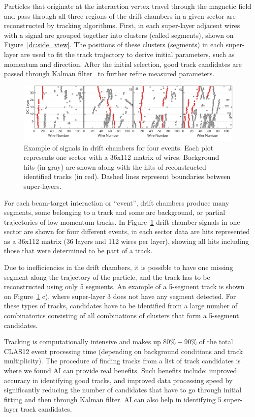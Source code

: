 Particles that originate at the interaction vertex travel through the magnetic field and pass through all 
three regions of the drift chambers in a given sector are reconstructed by tracking algorithms. First, 
in each super-layer adjacent wires with a signal are grouped together into clusters (called segments), 
shown on Figure~\ref{dc:side_view}. The positions of these clusters (segments) in each super-layer 
are used to fit the track trajectory to derive initial parameters, such as momentum and direction. 
After the initial selection, good track candidates are passed through Kalman filter~\cite{Kalman1960} 
 to further refine measured parameters.

\begin{figure}[!ht]
\begin{center}
 \includegraphics[width=6.2in]{images/figure_dc_examples.pdf}
\caption {Example of signals in drift chambers for four events. Each plot represents one sector with a 
36x112 matrix of wires. Background hits (in gray) are shown along with the hits of reconstructed 
identified tracks (in red). Dashed lines represent boundaries between super-layers.}
 \label{dc:events_sector}
 \end{center}
\end{figure}

For each beam-target interaction or ``event'', drift chambers produce many segments, some belonging 
to a track and some are background, or partial trajectories of low momentum tracks. In Figure~\ref{dc:events_sector} 
drift chamber signals in one sector are shown for four different  events, in each sector data are hits 
represented as a 36x112 matrix (36 layers and 112 wires per layer), showing all hits including those that 
were determined to be part of a track. 

Due to inefficiencies in the drift chambers, it is possible to have one missing segment along the trajectory 
of the particle, and the track has to be reconstructed using only 5 segments. An example of a 5-segment 
track is shown on Figure~\ref{dc:events_sector} c), where super-layer 3 does not have any segment detected. 
For these types of tracks, candidates have to be identified from a large number of combinatorics consisting 
of all combinations of clusters that form a  5-segment candidates. 

Tracking is computationally intensive and makes up $80\%-90\%$ of the total CLAS12 event processing 
time (depending on background conditions and track multiplicity). The procedure of finding tracks from a 
list of track candidates is where we found AI can provide real benefits. Such benefits include: improved 
accuracy in identifying good tracks, and improved data processing speed by significantly reducing the 
number of candidates that have to go through initial fitting and then through Kalman filter. AI can also 
help in identifying 5 super-layer track candidates.
